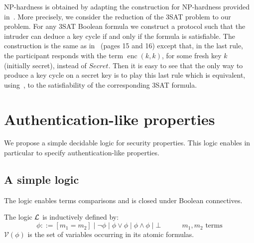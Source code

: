 \documentclass[acmtocl,acmnow]{acmtrans2m}
\newcommand{\comment}[1]{}
\newcommand{\var}{\mathcal{V}}
\newcommand{\lleft}[1]{\mathsf{lhs}(#1)}
\newcommand{\HK}{K}
\newcommand{\simple}{partial}
\newcommand{\enc}{\operatorname{enc}}
\newcommand{\lset}[1]{#1_s}
\newcommand{\logic}{{\cal L}}
\newcommand{\dedsyss}[1]{deducibility constraint systems}
\begin{document}
\comment{
Testing for key cycles or for conformance to an order of the encrypts
relation is done in Proposition~\ref{lemma_deter_ext} for keys that are not deducible from $\lset{L}$. If one
of the keys $k$ in $\HK$ is deducible, that is there is a {\simple} solution $\theta$ of $C$ such that
$\lleft{C}\theta\vdash k$, then we can simply construct a key cycle $\enc(k,k)$.

We deduce by combining Theorem~\ref{theo:general} and
Proposition~\ref{lemma_deter_ext} that the problem of deciding
$P_{kc}$ on arbitrary \dedsyss{} is in NP.
}

NP-hardness is obtained by adapting the construction for NP-hardness provided
in~\cite{RT03TCS}. More precisely, we consider the reduction of the 3SAT problem to our problem. For any 3SAT Boolean formula
we construct a protocol such that the intruder can deduce a key cycle if and only if the formula is
satisfiable. The construction is the same as in~\cite{RT03TCS} (pages 15 and 16) except that, in the last
rule, the participant responds with the term $\enc(k,k)$, for some fresh key $k$ (initially secret), instead
of $Secret$. Then it is easy to see that the only way to produce a key cycle on a secret key is to play this
last rule which is equivalent, using~\cite{RT03TCS}, to the satisfiability of the corresponding 3SAT
formula.











\section{Authentication-like properties}\label{sec:auth}
We propose a simple decidable logic for security properties. This
logic enables in particular to specify authentication-like properties.




\subsection{A simple logic}
The logic enables terms comparisons and is closed under Boolean connectives.



\begin{definition}
The logic $\logic$ is inductively defined by:
\[\phi ::= [m_1=m_2] \mid \neg \phi \mid \phi\vee\phi \mid
\phi\wedge\phi \mid \bot
\quad\quad\quad m_1,m_2 \mbox{ terms}
\]
$\var(\phi)$ is the set of variables occurring in its atomic formulas.
\end{definition}
\end{document}
